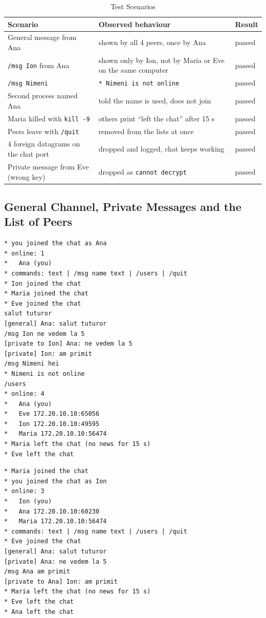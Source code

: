 \documentclass[11pt, a4paper]{article}
\begin{document}
\begin{table}[h]
\centering
\caption{Test Scenarios}
\label{tab:tests}
\begin{tabularx}{\textwidth}{@{}XXl@{}}
\toprule
\textbf{Scenario} & \textbf{Observed behaviour} & \textbf{Result} \\ \midrule
General message from Ana & shown by all 4 peers, once by Ana & passed \\
\texttt{/msg Ion} from Ana & shown only by Ion, not by Maria or Eve on the same computer & passed \\
\texttt{/msg Nimeni} & \texttt{* Nimeni is not online} & passed \\
Second process named Ana & told the name is used, does not join & passed \\
Maria killed with \texttt{kill -9} & others print ``left the chat'' after 15 s & passed \\
Peers leave with \texttt{/quit} & removed from the lists at once & passed \\
4 foreign datagrams on the chat port & dropped and logged, chat keeps working & passed \\
Private message from Eve (wrong key) & dropped as \texttt{cannot decrypt} & passed \\ \bottomrule
\end{tabularx}
\end{table}

\subsection{General Channel, Private Messages and the List of Peers}

\begin{lstlisting}[style=terminal, caption={Console of Ana}]
* you joined the chat as Ana
* online: 1
*   Ana (you)
* commands: text | /msg name text | /users | /quit
* Ion joined the chat
* Maria joined the chat
* Eve joined the chat
salut tuturor
[general] Ana: salut tuturor
/msg Ion ne vedem la 5
[private to Ion] Ana: ne vedem la 5
[private] Ion: am primit
/msg Nimeni hei
* Nimeni is not online
/users
* online: 4
*   Ana (you)
*   Eve 172.20.10.10:65056
*   Ion 172.20.10.10:49595
*   Maria 172.20.10.10:56474
* Maria left the chat (no news for 15 s)
* Eve left the chat
\end{lstlisting}

\begin{lstlisting}[style=terminal, caption={Console of Ion}]
* Maria joined the chat
* you joined the chat as Ion
* online: 3
*   Ion (you)
*   Ana 172.20.10.10:60230
*   Maria 172.20.10.10:56474
* commands: text | /msg name text | /users | /quit
* Eve joined the chat
[general] Ana: salut tuturor
[private] Ana: ne vedem la 5
/msg Ana am primit
[private to Ana] Ion: am primit
* Maria left the chat (no news for 15 s)
* Eve left the chat
* Ana left the chat
\end{lstlisting}
\end{document}
